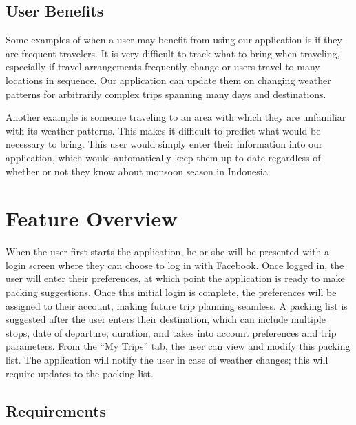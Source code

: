 \documentclass[11pt]{article}
\begin{document}
\subsection{User Benefits}
Some examples of when a user may benefit from using our application is if they are frequent travelers. It is very difficult to track what to bring when traveling, especially if travel arrangements frequently change or users travel to many locations in sequence. Our application can update them on changing weather patterns for arbitrarily complex trips spanning many days and destinations. 

Another example is someone traveling to an area with which they are unfamiliar with its weather patterns. This makes it difficult to predict what would be necessary to bring. This user would simply enter their information into our application, which would automatically keep them up to date regardless of whether or not they know about monsoon season in Indonesia.

\section{Feature Overview} %
    When the user first starts the application, he or she will be presented with a login screen where they can choose to log in with Facebook. Once logged in, the user will enter their preferences, at which point the application is ready to make packing suggestions. Once this initial login is complete, the preferences will be assigned to their account, making future trip planning seamless. A packing list is suggested after the user enters their destination, which can include multiple stops, date of departure, duration, and takes into account preferences and trip parameters. From the ``My Trips'' tab, the user can view and modify this packing list. The application will notify the user in case of weather changes; this will require updates to the packing list.

    \subsection{Requirements}
\end{document}
